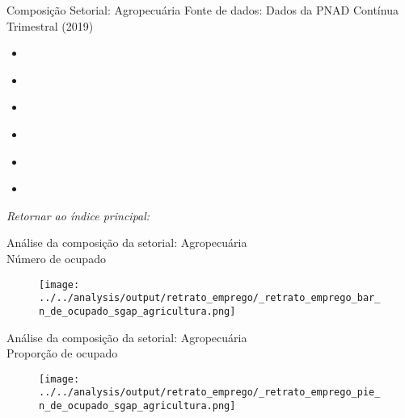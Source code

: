 \begin{frame}[label=_retrato_emprego_sgap_agricultura]{Composição Setorial: Agropecuária}
{\footnotesize Fonte de dados: Dados da PNAD Contínua Trimestral (2019)}

\begin{itemize}
\item{
	\hyperlink{_retrato_emprego_bar_n_de_ocupado_sgap_agricultura}{}
	}
\item{
	\hyperlink{_retrato_emprego_pie_n_de_ocupado_sgap_agricultura}{}
	} 
\item{
	\hyperlink{_retrato_emprego_bar_n_de_formal_sgap_agricultura}{}
	} 
\item{
	\hyperlink{_retrato_emprego_pie_n_de_formal_sgap_agricultura}{}
	} 
\item{
	\hyperlink{_retrato_emprego_bar_n_de_informal_sgap_agricultura}{}
	} 	
\item{	
	\hyperlink{_retrato_emprego_pie_n_de_informal_sgap_agricultura}{}
	} 		

\end{itemize}
\begin{small}
\textit{Retornar ao índice principal: \hyperlink{indice_principal}{} }
\end{small}
\end{frame}


\begin{frame}[label=_retrato_emprego_bar_n_de_ocupado_sgap_agricultura]{{\small Análise da composição da setorial: Agropecuária \\  Número de ocupado}}
\textit{\hyperlink{_retrato_emprego_sgap_agricultura}{}}
\begin{figure}
  \centering
  \texttt{[image: ../../analysis/output/retrato\_emprego/\_retrato\_emprego\_bar\_n\_de\_ocupado\_sgap\_agricultura.png]}
  \caption{}
  \label{fig:_retrato_emprego_bar_n_de_ocupado_sgap_agricultura}
\end{figure}
\end{frame}


\begin{frame}[label=_retrato_emprego_pie_n_de_ocupado_sgap_agricultura]{{\small Análise da composição da setorial: Agropecuária \\  Proporção de ocupado}}
\textit{\hyperlink{_retrato_emprego_sgap_agricultura}{}}
\begin{figure}
  \centering
  \texttt{[image: ../../analysis/output/retrato\_emprego/\_retrato\_emprego\_pie\_n\_de\_ocupado\_sgap\_agricultura.png]}
  \caption{}
  \label{fig:_retrato_emprego_pie_n_de_ocupado_sgap_agricultura}
\end{figure}
\end{frame}


